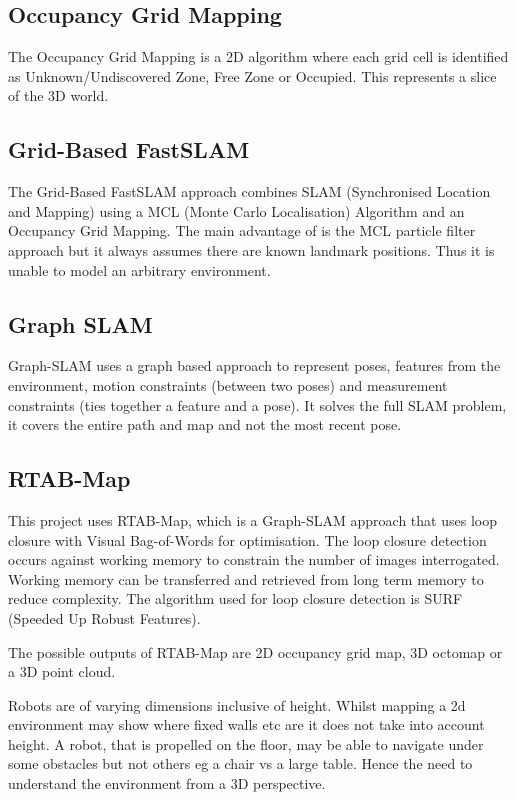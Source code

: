 \documentclass[10pt,journal,compsoc]{IEEEtran}
\begin{document}
\subsection{Occupancy Grid Mapping}
The Occupancy Grid Mapping\cite{occgripmap} is a 2D algorithm where each grid cell is identified as Unknown/Undiscovered Zone, Free Zone or Occupied. This represents a slice of the 3D world.

\subsection{Grid-Based FastSLAM}
The Grid-Based FastSLAM\cite{gridslam} approach combines SLAM (Synchronised Location and Mapping) using a MCL (Monte Carlo Localisation) Algorithm and an Occupancy Grid Mapping. The main advantage of is the MCL particle filter approach but it always assumes there are known landmark positions. Thus it is unable to model an arbitrary environment.

\subsection{Graph SLAM}
Graph-SLAM\cite{graphslam} uses a graph based approach to represent poses, features from the environment, motion constraints (between two poses) and measurement constraints (ties together a feature and a pose). It solves the full SLAM problem, it covers the entire path and map and not the most recent pose.

\subsection{RTAB-Map}
This project uses RTAB-Map\cite{rosrtabmap}, which is a Graph-SLAM approach that uses loop closure with Visual Bag-of-Words\cite{vbow} for optimisation.
The loop closure detection occurs against working memory to constrain the number of images interrogated. Working memory can be transferred and retrieved from long term memory to reduce complexity. The algorithm used for loop closure detection is SURF (Speeded Up Robust Features)\cite{surf}.

The possible outputs of RTAB-Map are 2D occupancy grid map, 3D octomap or a 3D point cloud.

Robots are of varying dimensions inclusive of height. Whilst mapping a 2d environment may show where fixed walls etc are it does not take into account height. A robot, that is propelled on the floor, may be able to navigate under some obstacles but not others eg a chair vs a large table. Hence the need to understand the environment from a 3D perspective.
\end{document}
